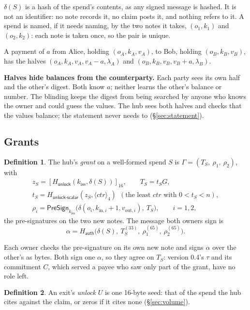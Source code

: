 \documentclass[11pt]{article}
\theoremstyle{plain}
\theoremstyle{definition}
\newtheorem{definition}{Definition}
\newcommand{\be}[2]{\langle #1\rangle_{#2}}
\newcommand{\pre}[2]{[#1]_{#2}}
\newcommand{\Ht}[1]{H_{\textsf{#1}}}
\newcommand{\PSign}{\mathsf{PreSign}}
\newcommand{\kiss}{k_{\mathrm{iss}}}
\begin{document}
$\delta(S)$ is a hash of the spend's contents, as any signed message is
hashed. It is not an identifier: no note records it, no claim posts it,
and nothing refers to it. A spend is named, if it needs naming, by the
two notes it takes, $(o_1, k_1)$ and $(o_2, k_2)$: each note is taken
once, so the pair is unique.

A payment of $a$ from Alice, holding $(o_A, k_A, v_A)$, to Bob, holding
$(o_B, k_B, v_B)$, has the halves $(o_A, k_A, v_A, v_A - a, \lambda_A)$
and $(o_B, k_B, v_B, v_B + a, \lambda_B)$.

\textbf{Halves hide balances from the counterparty.} Each party sees
its own half and the other's digest. Both know $a$; neither learns the
other's balance or number. The blinding keeps the digest from being
searched by anyone who knows the owner and could guess the values. The
hub sees both halves and checks that the values balance; the statement
never needs to (\S\ref{sec:statement}).

\subsection{Grants}\label{sec:grant}

\begin{definition}
The hub's \emph{grant} on a well-formed spend $S$ is $\Gamma = (T_S,\
\rho_1,\ \rho_2)$, with
\begin{gather*}
  z_S = \pre{\Ht{unlock}(\kiss, \delta(S))}{16},\qquad T_S = t_S G,\\
  t_S = \Ht{unlock-scalar}(z_S, \be{\mathit{ctr}}{4})\ \ (\text{the least
  } \mathit{ctr} \text{ with } 0 < t_S < n),\\
  \rho_i = \PSign_{\kiss}\big(\delta(o_i, k_{\mathrm{in},i} + 1,
  v_{\mathrm{out},i}),\ T_S\big),\qquad i = 1, 2,
\end{gather*}
the pre-signatures on the two new notes. The message both owners sign is
\[
  \alpha = \Ht{auth}\big(\delta(S),\ T_S^{(33)},\ \rho_1^{(65)},\
  \rho_2^{(65)}\big).
\]
\end{definition}

Each owner checks the pre-signature on its own new note and signs
$\alpha$ over the other's as bytes. Both sign one $\alpha$, so they
agree on $T_S$: version 0.4's $\tau$ and its commitment $C$, which
served a payee who saw only part of the grant, have no role left.

\begin{definition}
An exit's \emph{unlock} $U$ is one 16-byte seed: that of the spend the
hub cites against the claim, or zeros if it cites none
(\S\ref{sec:volume}).
\end{definition}
\end{document}
